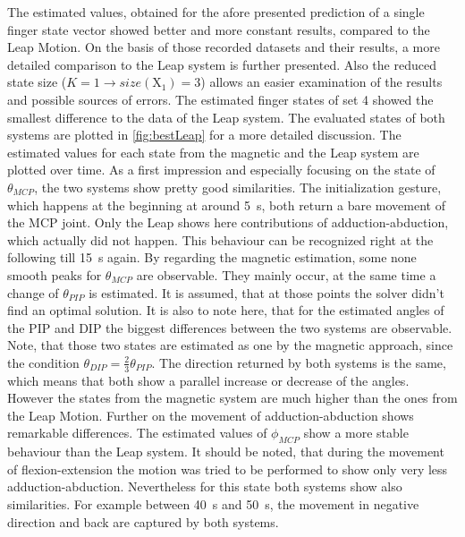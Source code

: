 The estimated values, obtained for the afore presented prediction of a single finger state vector showed better and more constant results, compared to the Leap Motion. On the basis of those recorded datasets and their results, a more detailed comparison to the Leap system is further presented. Also the reduced state size ($ K = 1 \rightarrow size(\mathrm{X}_{1}) = 3 $) allows an easier examination of the results and possible sources of errors. The estimated finger states of set 4 showed the smallest difference to the data of the Leap system. The evaluated states of both systems are plotted in \ref{fig:bestLeap} for a more detailed discussion. 
The estimated values for each state from the magnetic and the Leap system are plotted over time. As a first impression and especially focusing on the state of $ \theta_{MCP} $, the two systems show pretty good similarities. The initialization gesture, which happens at the beginning at around \SI{5}{\second}, both return a bare movement of the \ac{MCP} joint. Only the Leap shows here contributions of adduction-abduction, which actually did not happen. This behaviour can be recognized right at the following till \SI{15}{\second} again. By regarding the magnetic estimation, some none smooth peaks for $ \theta_{MCP} $ are observable. They mainly occur, at the same time a change of $ \theta_{PIP} $ is estimated. It is assumed, that at those points the solver didn't find an optimal solution. It is also to note here, that for the estimated angles of the \ac{PIP} and \ac{DIP} the biggest differences between the two systems are observable. Note, that those two states are estimated as one by the magnetic approach, since the condition $ \theta_{DIP} = \frac{2}{3} \theta_{PIP} $. The direction returned by both systems is the same, which means that both show a parallel increase or decrease of the angles. However the states from the magnetic system are much higher than the ones from the Leap Motion. Further on the movement of adduction-abduction shows remarkable differences. The estimated values of $ \phi_{MCP} $ show a more stable behaviour than the Leap system. It should be noted, that during the movement of flexion-extension the motion was tried to be performed to show only very less adduction-abduction. Nevertheless for this state both systems show also similarities. For example between \SI{40}{\second} and \SI{50}{\second}, the movement in negative direction and back are captured by both systems.
